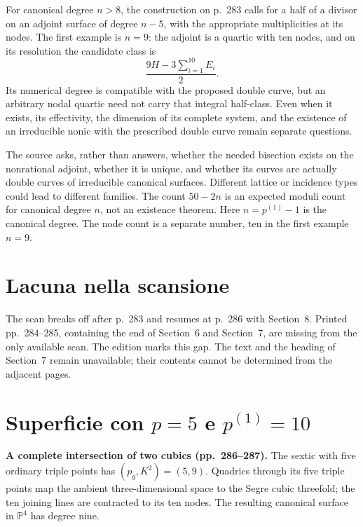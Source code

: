 For canonical degree \(n>8\), the construction on p.~283 calls for a half of a divisor on an adjoint surface of degree \(n-5\), with the appropriate multiplicities at its nodes. The first example is \(n=9\): the adjoint is a quartic with ten nodes, and on its resolution the candidate class is
\[
\frac{9H-3\sum_{i=1}^{10}E_i}{2}.
\]
Its numerical degree is compatible with the proposed double curve, but an arbitrary nodal quartic need not carry that integral half-class. Even when it exists, its effectivity, the dimension of its complete system, and the existence of an irreducible nonic with the prescribed double curve remain separate questions.

The source asks, rather than answers, whether the needed bisection exists on the nonrational adjoint, whether it is unique, and whether its curves are actually double curves of irreducible canonical surfaces. Different lattice or incidence types could lead to different families. The count \(50-2n\) is an expected moduli count for canonical degree \(n\), not an existence theorem. Here \(n=p^{(1)}-1\) is the canonical degree. The node count is a separate number, ten in the first example \(n=9\).

\section{Lacuna nella scansione}
\label{cp2-viii-7}

The scan breaks off after p.~283 and resumes at p.~286 with Section~8. Printed pp.~284--285, containing the end of Section~6 and Section~7, are missing from the only available scan. The edition marks this gap. The text and the heading of Section~7 remain unavailable; their contents cannot be determined from the adjacent pages.

\section{Superficie con \texorpdfstring{$p=5$}{p=5} e \texorpdfstring{$p^{(1)}=10$}{p(1)=10}}
\label{cp2-viii-8}

\textbf{A complete intersection of two cubics (pp.~286--287).}
The sextic with five ordinary triple points has \((p_g,K^2)=(5,9)\). Quadrics through its five triple points map the ambient three-dimensional space to the Segre cubic threefold; the ten joining lines are contracted to its ten nodes. The resulting canonical surface in \(\mathbb P^4\) has degree nine.

